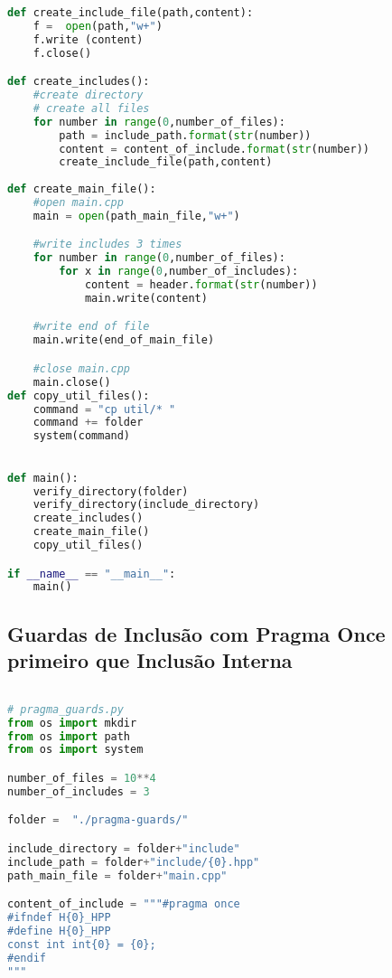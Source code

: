 \begin{apendicesenv}
\begin{lstlisting}[language=Python, caption={
Script Guardas de Inclusão Interna primeiro que \textit{Pragma Once}},
                   label=script_guards_pragma_include]
def create_include_file(path,content):
    f =  open(path,"w+")
    f.write (content)
    f.close()

def create_includes():
    #create directory
    # create all files
    for number in range(0,number_of_files):
        path = include_path.format(str(number))
        content = content_of_include.format(str(number))
        create_include_file(path,content)
    
def create_main_file():
    #open main.cpp
    main = open(path_main_file,"w+")

    #write includes 3 times
    for number in range(0,number_of_files):
        for x in range(0,number_of_includes):
            content = header.format(str(number))
            main.write(content)

    #write end of file
    main.write(end_of_main_file)

    #close main.cpp
    main.close()
def copy_util_files():                                                           
    command = "cp util/* "                                                       
    command += folder                                                            
    system(command)                                                              
                    

def main():
    verify_directory(folder)
    verify_directory(include_directory)
    create_includes()
    create_main_file()
    copy_util_files()

if __name__ == "__main__":
    main()
\end{lstlisting}

\subsection{Guardas de Inclusão com Pragma Once primeiro que Inclusão Interna}
\begin{lstlisting}[language=Python, caption={
    Script \textit{Pragma Once} primeiro que Guardas de Inclusão Interna},label=script_pragma_guards_include]
    
# pragma_guards.py
from os import mkdir
from os import path
from os import system

number_of_files = 10**4
number_of_includes = 3

folder =  "./pragma-guards/"

include_directory = folder+"include"
include_path = folder+"include/{0}.hpp"
path_main_file = folder+"main.cpp"

content_of_include = """#pragma once
#ifndef H{0}_HPP
#define H{0}_HPP
const int int{0} = {0};
#endif
"""


\end{lstlisting}
\end{apendicesenv}
